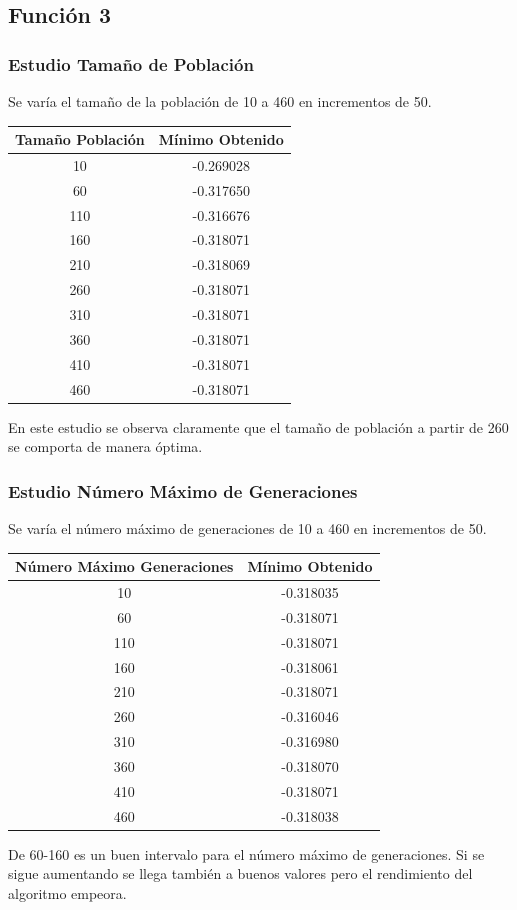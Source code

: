 \documentclass[12pt]{article}
\begin{document}
\subsection{Función 3}
\subsubsection*{Estudio Tamaño de Población}
	Se varía el tamaño de la población de 10 a 460 en incrementos de 50.
\begin{table}[H]
\begin{center}
\begin{tabular}{|cc|} \hline
Tamaño Población & Mínimo Obtenido \\  \hline
10  & -0.269028 \\ 
60  & -0.317650 \\ 
110 & -0.316676 \\
160 & -0.318071 \\
210 & -0.318069 \\
260 & -0.318071 \\
310 & -0.318071 \\
360 & -0.318071 \\ 
410 & -0.318071 \\
460 & -0.318071 \\  \hline
\end{tabular}
\end{center}
\end{table}
	En este estudio se observa claramente que el tamaño de población a partir de 260 se comporta de manera óptima. 

\subsubsection*{Estudio Número Máximo de Generaciones}
	Se varía el número máximo de generaciones de 10 a 460 en incrementos de 50.
\begin{table}[H]
\begin{center}
\begin{tabular}{|cc|} \hline
Número Máximo Generaciones & Mínimo Obtenido \\  \hline
10  & -0.318035 \\ 
60  & -0.318071 \\ 
110 & -0.318071 \\
160 & -0.318061 \\
210 & -0.318071 \\
260 & -0.316046 \\
310 & -0.316980 \\
360 & -0.318070 \\ 
410 & -0.318071 \\
460 & -0.318038 \\  \hline
\end{tabular}
\end{center}
\end{table}
	De 60-160 es un buen intervalo para el número máximo de generaciones. Si se sigue aumentando se llega también a buenos valores pero el rendimiento del algoritmo empeora.
\end{document}
